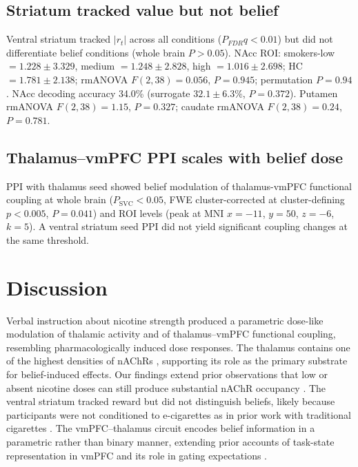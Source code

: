 \documentclass[11pt]{article}
\begin{document}
\subsection{Striatum tracked value but not belief}
Ventral striatum tracked $|r_t|$ across all conditions ($P_{FDR} q<0.01$) but did not differentiate belief conditions (whole brain $P>0.05$). NAcc ROI: smokers-low $=1.228 \pm 3.329$, medium $=1.248 \pm 2.828$, high $=1.016 \pm 2.698$; HC $=1.781 \pm 2.138$; rmANOVA $F(2,38)=0.056$, $P=0.945$; permutation $P=0.94$. NAcc decoding accuracy 34.0\% (surrogate $32.1 \pm 6.3\%$, $P=0.372$). Putamen rmANOVA $F(2,38)=1.15$, $P=0.327$; caudate rmANOVA $F(2,38)=0.24$, $P=0.781$.

\subsection{Thalamus--vmPFC PPI scales with belief dose}
PPI with thalamus seed showed belief modulation of thalamus-vmPFC functional coupling at whole brain ($P_\text{SVC}<0.05$, FWE cluster-corrected at cluster-defining $p<0.005$, $P=0.041$) and ROI levels (peak at MNI $x=-11$, $y=50$, $z=-6$, $k=5$). A ventral striatum seed PPI did not yield significant coupling changes at the same threshold.

\section{Discussion}
Verbal instruction about nicotine strength produced a parametric dose-like modulation of thalamic activity and of thalamus--vmPFC functional coupling, resembling pharmacologically induced dose responses. The thalamus contains one of the highest densities of nAChRs \citep{r19,r20,r42,r43,r44,r45}, supporting its role as the primary substrate for belief-induced effects. Our findings extend prior observations that low or absent nicotine doses can still produce substantial nAChR occupancy \citep{r22,r23,r24}. The ventral striatum tracked reward but did not distinguish beliefs, likely because participants were not conditioned to e-cigarettes as in prior work with traditional cigarettes \citep{r10,r11}. The vmPFC--thalamus circuit encodes belief information in a parametric rather than binary manner, extending prior accounts of task-state representation in vmPFC \citep{r35,r36,r48} and its role in gating expectations \citep{r49}.



\end{document}
